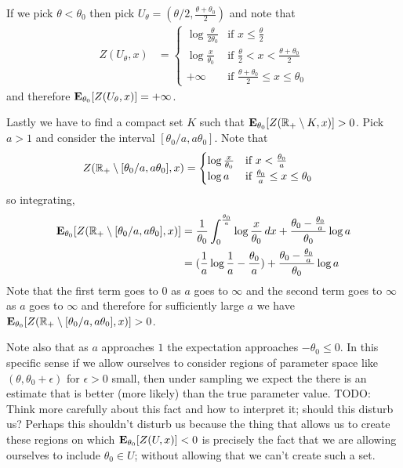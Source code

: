 \begin{examp}
If we pick $\theta < \theta_0$ then pick $U_\theta = (\theta/2,
\frac{\theta + \theta_0}{2})$ and note that 
\begin{align*}
Z(U_\theta, x) &= \begin{cases}
\log \frac{\theta}{2\theta_0} & \text{if $x \leq \frac{\theta}{2}$} \\
\log \frac{x}{\theta_0} & \text{if $\frac{\theta}{2} < x < \frac{\theta + \theta_0}{2}$} \\
+\infty & \text{if $\frac{\theta + \theta_0}{2} \leq x \leq \theta_0$}
\end{cases}
\end{align*} 
and therefore $\sexpectation{Z(U_\theta, x)}{\theta_0} = +\infty$.

Lastly we have to find a compact set $K$ such that
$\sexpectation{Z(\reals_+ \setminus K, x)}{\theta_0} > 0$.  Pick $a >
1$ and consider the interval $[\theta_0/a, a\theta_0]$.  Note that 
\begin{align*}
Z(\reals_+ \setminus [\theta_0/a, a\theta_0], x) &= \begin{cases}
\log \frac{x}{\theta_0} & \text{if $x < \frac{\theta_0}{a}$} \\
\log a & \text{if $\frac{\theta_0}{a} \leq x \leq \theta_0$} \\
\end{cases}
\end{align*}
so integrating,
\begin{align*}
\sexpectation{Z(\reals_+ \setminus [\theta_0/a, a\theta_0],
  x)}{\theta_0} &= 
\frac{1}{\theta_0} \int_0^{\frac{\theta_0}{a}} \log \frac{x}{\theta_0}
\, dx
+ \frac{\theta_0 - \frac{\theta_0}{a}}{\theta_0} \log a \\
&=(\frac{1}{a} \log \frac{1}{a} - \frac{\theta_0}{a}) + \frac{\theta_0 - \frac{\theta_0}{a}}{\theta_0} \log a \\
\end{align*}
Note that the first term goes to $0$ as $a$ goes to $\infty$ and the
second term goes to $\infty$ as $a$ goes to $\infty$ and therefore for
sufficiently large $a$ we have $\sexpectation{Z(\reals_+ \setminus [\theta_0/a, a\theta_0],
  x)}{\theta_0} > 0$.

Note also that as $a$ approaches $1$ the expectation approaches
$-\theta_0 \leq 0$.  In this specific sense if we allow
ourselves to consider regions of parameter space like $(\theta,
\theta_0+\epsilon)$ for $\epsilon > 0$ small, then under sampling we expect the there
is an estimate that is better (more likely) than the true parameter
value.  TODO: Think more carefully about this fact and how to
interpret it; should this disturb us?  Perhaps this shouldn't disturb
us because the thing that allows us to create these regions on which 
$\sexpectation{Z(U, x)}{\theta_0} < 0$ is precisely the fact that we
are allowing ourselves to include $\theta_0 \in U$; without allowing
that we can't create such a set.


\end{examp}
